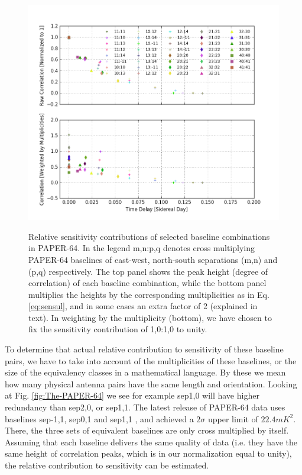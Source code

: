\documentclass[preprint2,numberedappendix,tighten,twocolappendix]{aastex6}  %
\renewcommand\[{\begin{equation}}
\renewcommand\]{\end{equation}}
\begin{document}
\begin{figure}[H]
\includegraphics[width=\linewidth]{sensitivity}
\label{fig:sensplot}
\caption{Relative sensitivity contributions of selected baseline combinations in PAPER-64. In the legend m,n:p,q denotes cross
multiplying PAPER-64 baselines of east-west, north-south separations (m,n) and (p,q) respectively. The top
panel shows the peak height (degree of correlation) of each baseline
combination, while the bottom panel multiplies the heights by the
corresponding multiplicities as in Eq. \eqref{eq:sensul}, and in some cases an extra factor of 2 (explained in text). 
In weighting by the multiplicity (bottom), we have chosen to fix the sensitivity 
contribution of 1,0:1,0 to unity. }


\end{figure}


To determine that actual relative contribution to sensitivity of these
baseline pairs, we have to take into account of the multiplicities of
these baselines, or the size of the equivalency classes in a mathematical
language. By these we mean how many physical antenna pairs have the
same length and orientation. Looking at Fig. \ref{fig:The-PAPER-64}
we see for example sep1,0 will have higher redundancy than sep2,0,
or sep1,1. The latest release of PAPER-64 data uses baselines sep-1,1,
sep0,1 and sep1,1 \cite{Ali2015}, and achieved a $2\sigma$ upper
limit of $22.4mK^{2}$. There, the three sets of equivalent baselines
are only cross multiplied by itself. Assuming that each baseline delivers
the same quality of data (i.e. they have the same height of correlation
peaks, which is in our normalization equal to unity), the relative
contribution to sensitivity can be estimated. 
\end{document}
